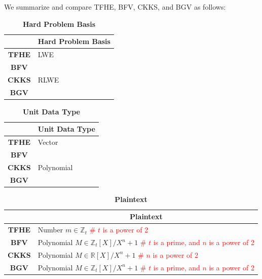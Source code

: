 
We summarize and compare TFHE, BFV, CKKS, and BGV as follows:

\captionsetup{justification=raggedright,singlelinecheck=false,labelfont=bf}

\begin{table}[h]
\begin{tabular}{|c||l|}
\hline
&\textbf{Hard Problem Basis}\\\hline\hline
\textbf{TFHE}&LWE\\\hline
\textbf{BFV}&\\
\textbf{CKKS}&RLWE\\
\textbf{BGV}&\\\hline
\end{tabular}
\caption{\textbf{Hard Problem Basis}}
\end{table}

\begin{table}[h]
\begin{tabular}{|c||l|}
\hline
&\textbf{Unit Data Type}\\\hline\hline
\textbf{TFHE}&Vector\\\hline
\textbf{BFV}&\\
\textbf{CKKS}&Polynomial\\
\textbf{BGV}&\\\hline
\end{tabular}
\caption{\textbf{Unit Data Type}}
\end{table}

\begin{table}[h]
\begin{tabular}{|c||l|}
\hline
&\multicolumn{1}{c|}{\textbf{Plaintext}}\\\hline\hline
\textbf{TFHE}&Number $m \in \mathbb{Z}_t$ \text{ } \textcolor{red}{ \# $t$ is a power of 2}\\\hline
\textbf{BFV}&Polynomial $M \in \mathbb{Z}_t[X]/X^n+1$ \text{ } \textcolor{red}{ \# $t$ is a prime, and $n$ is a power of 2}\\\hline
\textbf{CKKS}&Polynomial $M \in \mathbb{R}[X]/X^n+1$ \text{ }\textcolor{red}{ \# $n$ is a power of 2}\\\hline
\textbf{BGV}&Polynomial $M \in \mathbb{Z}_t[X]/X^n+1$ \text{ } \textcolor{red}{ \# $t$ is a prime, and $n$ is a power of 2}\\\hline
\end{tabular}
\caption{\textbf{Plaintext}}
\end{table}

